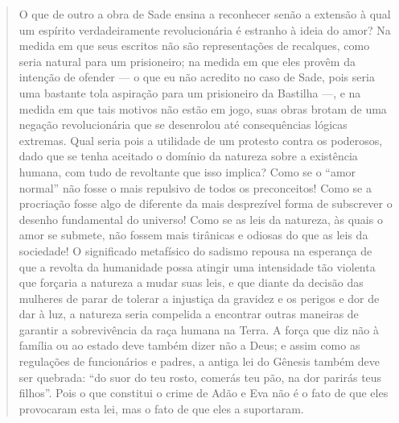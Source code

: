 \begin{quote}
O que de outro a obra de Sade ensina a reconhecer senão a extensão à qual um espírito verdadeiramente revolucionária é estranho à ideia do amor? Na medida em que seus escritos não são representações de recalques, como seria natural para um prisioneiro; na medida em que eles provêm da intenção de ofender --- o que eu não acredito no caso de Sade, pois seria uma bastante tola aspiração para um prisioneiro da Bastilha ---, e na medida em que tais motivos não estão em jogo, suas obras brotam de uma negação revolucionária que se desenrolou até consequências lógicas extremas. Qual seria pois a utilidade de um protesto contra os poderosos, dado que se tenha aceitado o domínio da natureza sobre a existência humana, com tudo de revoltante que isso implica? Como se o ``amor normal'' não fosse o mais repulsivo de todos os preconceitos! Como se a procriação fosse algo de diferente da mais desprezível forma de subscrever o desenho fundamental do universo! Como se as leis da natureza, às quais o amor se submete, não fossem mais tirânicas e odiosas do que as leis da sociedade! O significado metafísico do sadismo repousa na esperança de que a revolta da humanidade possa atingir uma intensidade tão violenta que forçaria a natureza a mudar suas leis, e que diante da decisão das mulheres de parar de tolerar a injustiça da gravidez e os perigos e dor de dar à luz, a natureza seria compelida a encontrar outras maneiras de garantir a sobrevivência da raça humana na Terra. A força que diz não à família ou ao estado deve também dizer não a Deus; e assim como as regulações de funcionários e padres, a antiga lei do Gênesis também deve ser quebrada: ``do suor do teu rosto, comerás teu pão, na dor parirás teus filhos''. Pois o que constitui o crime de Adão e Eva não é o fato de que eles provocaram esta lei, mas o fato de que eles a suportaram.
\end{quote}

